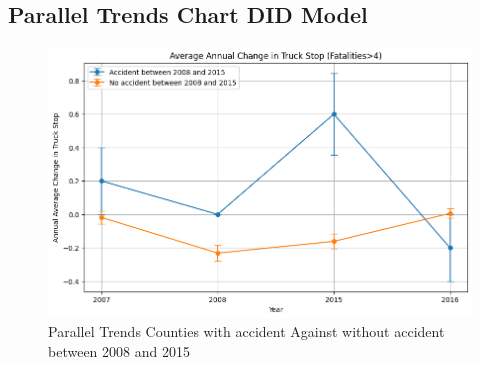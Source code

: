 \documentclass[
  12pt]{article}
\begin{document}
\subsection{Parallel Trends Chart DID
Model}\label{sec-parallel-trends-chart-did-model}

\begin{figure}[H]

{\centering \includegraphics[width=4.71875in,height=\textheight]{images/output-01.png}

}

\caption{Parallel Trends Counties with accident Against without accident
between 2008 and 2015}

\end{figure}%


\renewcommand\refname{References}
  
\end{document}

